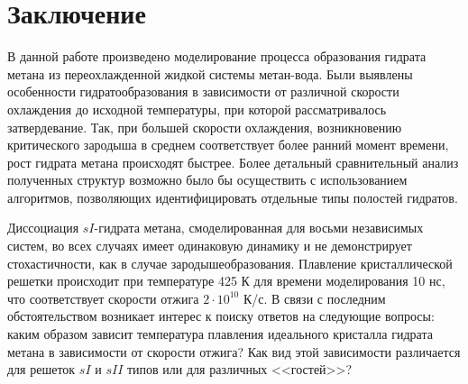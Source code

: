 \chapter*{Заключение}
В данной работе произведено моделирование процесса образования гидрата метана из переохлажденной жидкой системы метан-вода. Были выявлены особенности гидратообразования в зависимости от различной скорости охлаждения до исходной температуры, при которой рассматривалось затвердевание. Так, при большей скорости охлаждения, возникновению критического зародыша в среднем соответствует более ранний момент времени, рост гидрата метана происходят быстрее. Более детальный сравнительный анализ полученных структур возможно было бы осуществить с использованием алгоритмов, позволяющих идентифицировать отдельные типы полостей гидратов.

Диссоциация $sI$-гидрата метана, смоделированная для восьми независимых систем, во всех случаях имеет одинаковую динамику и не демонстрирует стохастичности, как в случае зародышеобразования. Плавление кристаллической решетки происходит при температуре 425 К для времени моделирования 10 нс, что соответствует скорости отжига $2\cdot 10^{10}$ К/с. В связи с последним обстоятельством возникает интерес к поиску ответов на следующие вопросы: каким образом зависит температура плавления идеального кристалла гидрата метана в зависимости от скорости отжига? Как вид этой зависимости различается для решеток $sI$ и $sII$ типов или для различных <<гостей>>?